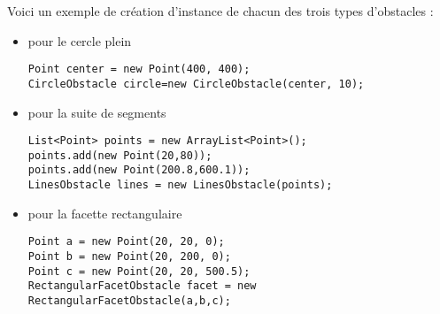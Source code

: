 \documentclass{article}
\begin{document}


Voici un exemple de création d'instance de chacun des trois types d'obstacles :\medskip

\begin{itemize}
\item pour le cercle plein\smallskip
\begin{lstlisting}[frame=single]
Point center = new Point(400, 400);
CircleObstacle circle=new CircleObstacle(center, 10);
\end{lstlisting}\smallskip
\item pour la suite de segments\smallskip
\begin{lstlisting}[frame=single]
List<Point> points = new ArrayList<Point>();
points.add(new Point(20,80));
points.add(new Point(200.8,600.1));
LinesObstacle lines = new LinesObstacle(points);
\end{lstlisting}\smallskip
\item pour la facette rectangulaire\smallskip
\begin{lstlisting}[frame=single]
Point a = new Point(20, 20, 0);
Point b = new Point(20, 200, 0);
Point c = new Point(20, 20, 500.5);
RectangularFacetObstacle facet = new RectangularFacetObstacle(a,b,c);
\end{lstlisting}
\end{itemize}

%
%
\end{document}
